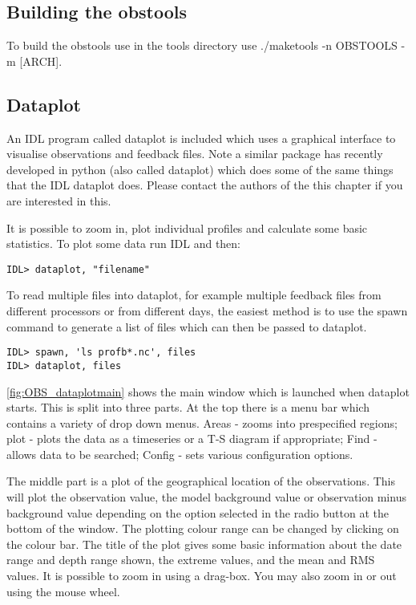 \documentclass[../main/NEMO_manual]{subfiles}
\begin{document}
\subsection{Building the obstools}

To build the obstools use in the tools directory use ./maketools -n OBSTOOLS -m [ARCH].

\subsection{Dataplot}

An IDL program called dataplot is included which uses a graphical interface to
visualise observations and feedback files. Note a similar package has recently developed in python (also called dataplot) which does some of the same things that the IDL dataplot does. Please contact the authors of the this chapter if you are interested in this.

It is possible to zoom in, plot individual profiles and calculate some basic statistics.
To plot some data run IDL and then:

\begin{verbatim}
IDL> dataplot, "filename"
\end{verbatim}

To read multiple files into dataplot,
for example multiple feedback files from different processors or from different days,
the easiest method is to use the spawn command to generate a list of files which can then be passed to dataplot.

\begin{verbatim}
IDL> spawn, 'ls profb*.nc', files
IDL> dataplot, files
\end{verbatim}

\autoref{fig:OBS_dataplotmain} shows the main window which is launched when dataplot starts.
This is split into three parts.
At the top there is a menu bar which contains a variety of drop down menus.
Areas - zooms into prespecified regions;
plot - plots the data as a timeseries or a T-S diagram if appropriate;
Find - allows data to be searched;
Config - sets various configuration options.

The middle part is a plot of the geographical location of the observations.
This will plot the observation value, the model background value or observation minus background value depending on
the option selected in the radio button at the bottom of the window.
The plotting colour range can be changed by clicking on the colour bar.
The title of the plot gives some basic information about the date range and depth range shown,
the extreme values, and the mean and RMS values.
It is possible to zoom in using a drag-box.
You may also zoom in or out using the mouse wheel.
\end{document}
